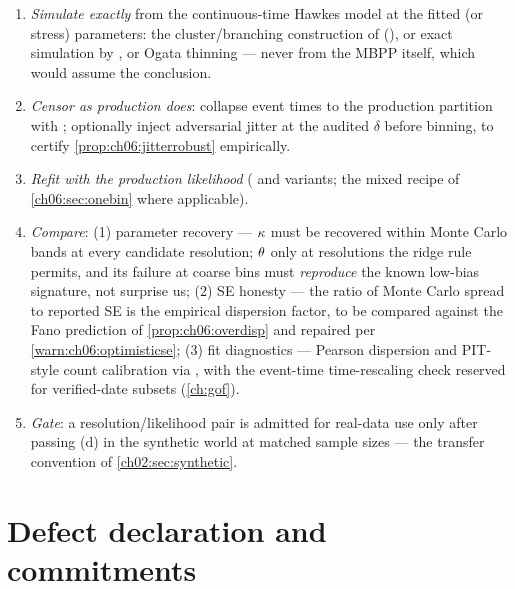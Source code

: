 \begin{protocol}\label{prot:ch06:icloop}
\leavevmode
\begin{enumerate}[label=(\alph*)]
\item \emph{Simulate exactly} from the continuous-time Hawkes model at the
fitted (or stress) parameters: the cluster/branching construction of
\citet{hawkesoakes1974} (), or exact
simulation by \citet{dassioszhao2013}, or Ogata thinning
\citep{ogata1981,lewisshedler1979} --- never from the MBPP itself, which
would assume the conclusion.
\item \emph{Censor as production does}: collapse event times to the
production partition with ; optionally inject
adversarial jitter at the audited $\delta$ before binning, to certify
\cref{prop:ch06:jitterrobust} empirically.
\item \emph{Refit with the production likelihood}
( and variants; the mixed recipe of
\cref{ch06:sec:onebin} where applicable).
\item \emph{Compare}: (1) parameter recovery --- $\kappa$ must be
recovered within Monte Carlo bands at every candidate resolution;
$\theta$ only at resolutions the ridge rule permits, and its failure at
coarse bins must \emph{reproduce} the known low-bias signature, not
surprise us; (2) SE honesty --- the ratio of Monte Carlo spread to
reported SE is the empirical dispersion factor, to be compared against the
Fano prediction of \cref{prop:ch06:overdisp} and repaired per
\cref{warn:ch06:optimisticse}; (3) fit diagnostics --- Pearson dispersion
and PIT-style count calibration \citep{czado2009} via
, with the event-time time-rescaling check
\citep{brown2002} reserved for verified-date subsets
(\cref{ch:gof}).
\item \emph{Gate}: a resolution/likelihood pair is admitted for real-data
use only after passing (d) in the synthetic world at matched sample sizes
--- the transfer convention of \cref{ch02:sec:synthetic}.
\end{enumerate}
\end{protocol}

\section{Defect declaration and commitments}\label{ch06:sec:decisions}


